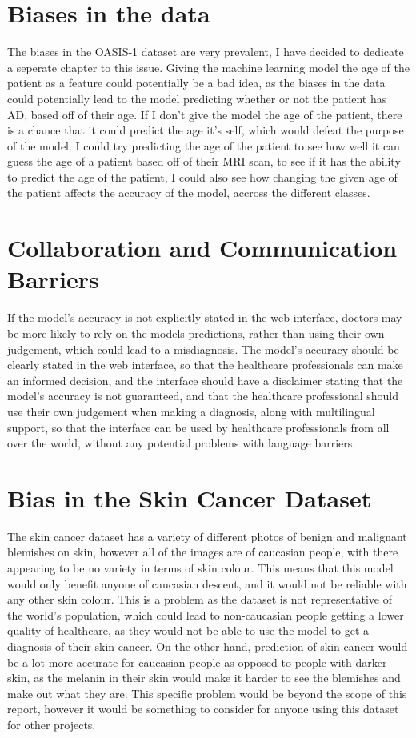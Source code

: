 \documentclass[]{final_report}
\begin{document}
\section{Biases in the data}

The biases in the OASIS-1 dataset are very prevalent, I have decided to dedicate a seperate chapter to this issue. Giving the machine learning model the age of the patient as a feature could potentially be a bad idea, as the biases in the data could potentially lead to the model predicting whether or not the patient has AD, based off of their age. If I don't give the model the age of the patient, there is a chance that it could predict the age it's self, which would defeat the purpose of the model. I could try predicting the age of the patient to see how well it can guess the age of a patient based off of their MRI scan, to see if it has the ability to predict the age of the patient, I could also see how changing the given age of the patient affects the accuracy of the model, accross the different classes.

\section{Collaboration and Communication Barriers}
If the model's accuracy is not explicitly stated in the web interface, doctors may be more likely to rely on the models predictions, rather than using their own judgement, which could lead to a misdiagnosis. The model's accuracy should be clearly stated in the web interface, so that the healthcare professionals can make an informed decision, and the interface should have a disclaimer stating that the model's accuracy is not guaranteed, and that the healthcare professional should use their own judgement when making a diagnosis, along with multilingual support, so that the interface can be used by healthcare professionals from all over the world, without any potential problems with language barriers.

\section{Bias in the Skin Cancer Dataset}
The skin cancer dataset has a variety of different photos of benign and malignant blemishes on skin, however all of the images are of caucasian people, with there appearing to be no variety in terms of skin colour. This means that this model would only benefit anyone of caucasian descent, and it would not be reliable with any other skin colour. This is a problem as the dataset is not representative of the world's population, which could lead to non-caucasian people getting a lower quality of healthcare, as they would not be able to use the model to get a diagnosis of their skin cancer.
On the other hand, prediction of skin cancer would be a lot more accurate for caucasian people as opposed to people with darker skin, as the melanin in their skin would make it harder to see the blemishes and make out what they are. This specific problem would be beyond the scope of this report, however it would be something to consider for anyone using this dataset for other projects.
\end{document}
